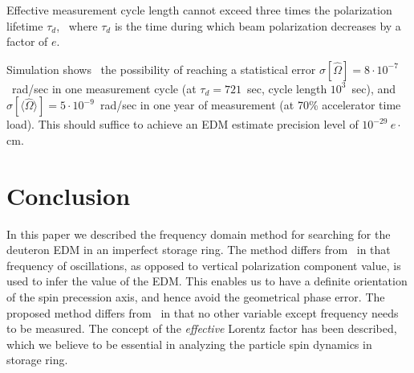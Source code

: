 \documentclass[a4paper]{jpconf}
\newcommand{\avg}[1]{\langle{#1}\rangle}
\newcommand{\W}{\Omega}
\begin{document}
Effective measurement cycle length cannot exceed three times the polarization lifetime $\tau_d$,~\cite{Stats} where $\tau_d$ is the time during which beam polarization decreases by a factor of $e$.

Simulation shows~\cite{Stats} the possibility of reaching a statistical error $\sigma[\hat\W]=8\cdot10^{-7}$~rad/sec in one measurement cycle (at $\tau_d = 721$~sec, cycle length $10^3$~sec), and $\sigma[\avg{\hat\W}]=5\cdot10^{-9}$~rad/sec in one year of measurement (at 70\% accelerator time load). This should suffice to achieve an EDM estimate precision level of $10^{-29}~e\cdot$cm.

\section{Conclusion}
In this paper we described the frequency domain method for searching for the deuteron EDM in an imperfect storage ring. The method differs from~\cite{Farley, AGS-proposal-deuteron} in that frequency of oscillations, as opposed to vertical polarization component value, is used to infer the value of the EDM. This enables us to have a definite orientation of the spin precession axis, and hence avoid the geometrical phase error. 
The proposed method differs from~\cite{Koop2015} in that no other variable except frequency needs to be measured. The concept of the \textit{effective} Lorentz factor has been described, which we believe to be essential in analyzing the particle spin dynamics in storage ring.
\end{document}

